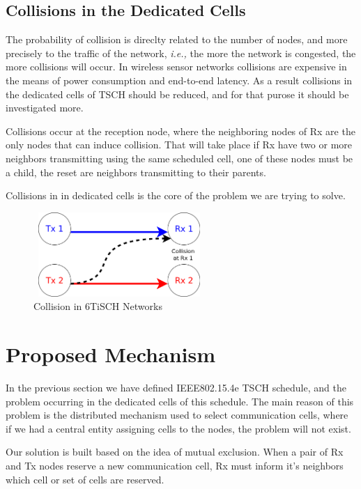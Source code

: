 \documentclass[10pt, conference, compsocconf]{IEEEtran}
\begin{document}
\subsection{Collisions in the Dedicated Cells }

The probability of collision is direclty related to the number of nodes, and more precisely to the traffic of the network, {\em i.e.,} the more the network is congested, the more collisions will occur. In wireless sensor networks collisions are expensive in the means of power consumption and  end-to-end latency. As a result collisions in the dedicated cells of TSCH should be reduced, and for that purose it should be investigated more. 


 Collisions occur at the reception node, where the neighboring nodes of Rx are the only nodes that can induce collision. That will take place if Rx have two or more neighbors transmitting using the same scheduled cell, one of these nodes must be a child, the reset are neighbors transmitting to their parents. 
   
Collisions in in dedicated cells is the core of the problem we are trying to solve. 
\begin{figure}[h]
    \centering
    \includegraphics[width=6.5cm, height=3.2cm]{collision.png}
    \caption{Collision in 6TiSCH Networks}
    \label{fig:Collision in 6TiSCH Networks}
\end{figure}



\section{Proposed Mechanism}

In the previous section we have defined IEEE802.15.4e TSCH schedule, and the problem occurring in the dedicated cells of this schedule. The main reason of this problem is the distributed mechanism used to select communication cells, where if we had a central entity assigning cells to the nodes, the problem will not exist. 

Our solution is built based on the idea of mutual exclusion. When a pair of Rx and Tx nodes reserve a new communication cell, Rx must inform it's neighbors which cell or set of cells are reserved. 
\end{document}

